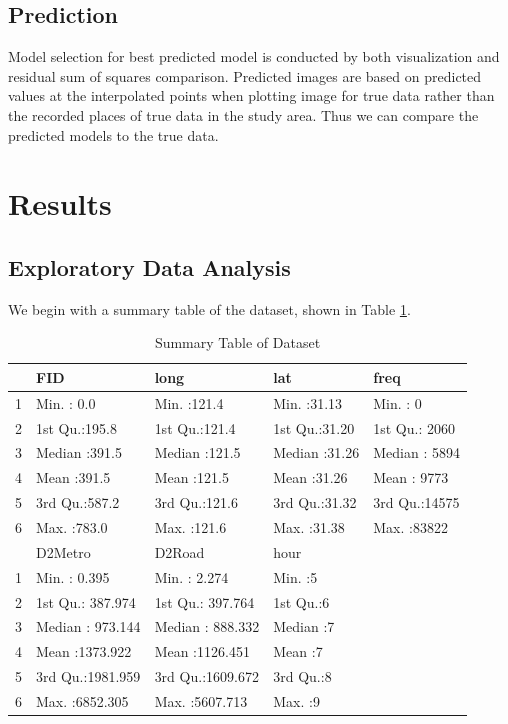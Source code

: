 \documentclass[hidelinks,12pt]{article}
\begin{document}
	\subsection{Prediction}
	Model selection for best predicted model is conducted by both visualization and residual sum of squares comparison. Predicted images are based on predicted values at the interpolated points when plotting image for true data rather than the recorded places of true data in the study area. Thus we can compare the predicted models to the true data. 
	
	\section{Results}\label{sec:res}
	\subsection{Exploratory Data Analysis}\label{sec:reseda}
	We begin with a summary table of the dataset, shown in Table \ref{tbl:sumdata}.
	\begin{table}[ht]
		\centering
		\caption{Summary Table of Dataset \label{tbl:sumdata}}
		\begin{tabular}{rllll}
			\hline
			&      FID &      long &      lat &      freq  \\ 
			\hline
			1 & Min.   :  0.0   & Min.   :121.4   & Min.   :31.13   & Min.   :    0     \\ 
			2 & 1st Qu.:195.8   & 1st Qu.:121.4   & 1st Qu.:31.20   & 1st Qu.: 2060     \\ 
			3 & Median :391.5   & Median :121.5   & Median :31.26   & Median : 5894    \\ 
			4 & Mean   :391.5   & Mean   :121.5   & Mean   :31.26   & Mean   : 9773      \\ 
			5 & 3rd Qu.:587.2   & 3rd Qu.:121.6   & 3rd Qu.:31.32   & 3rd Qu.:14575    \\ 
			6 & Max.   :783.0   & Max.   :121.6   & Max.   :31.38   & Max.   :83822      \\ 
			\hline
			 &    D2Metro &     D2Road &      hour &\\
			\hline
			1  & Min.   :   0.395 & Min.   :   2.274   & Min.   :5 &\\
			2    & 1st Qu.: 387.974  & 1st Qu.: 397.764   & 1st Qu.:6 & \\
			3   & Median : 973.144  & Median : 888.332   & Median :7 &\\
			4  & Mean   :1373.922 & Mean   :1126.451   & Mean   :7 &\\
			5   & 3rd Qu.:1981.959 & 3rd Qu.:1609.672   & 3rd Qu.:8  &\\
			6   & Max.   :6852.305 & Max.   :5607.713   & Max.   :9 & \\
			\hline
		\end{tabular}
	\end{table}
\end{document}
